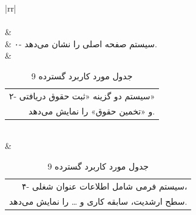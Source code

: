 \documentclass[12pt]{article}
\begin{document}
	\begin{center}
		\begin{table}[H]
			\caption{جدول مورد کاربرد گسترده 9}
			\label{tab:ext-uc9}
			\begin{tabular}{|rr|}
				\hline
				\rowcolor{Gainsboro!60}
				                                                                                                                                                                           \\ \hline
				                                                                                                                                                                                                                                          \\ \hline
				                                                                                            &                                                                                \\ \hline
				                                                                                                                    & ۰-  سیستم صفحه اصلی را نشان می‌دهد.                                                                                           \\ \hline
				      & \begin{tabular}[c]{@{}r@{}}۲- سیستم دو گزینه «ثبت حقوق دریافتی» \\ و «تخمین حقوق» را نمایش می‌دهد.\end{tabular}               \\ \hline
				                          & \begin{tabular}[c]{@{}r@{}}۴- سیستم فرمی شامل اطلاعات عنوان شغلی، \\ سطح ارشدیت، سابقه کاری و … را نمایش می‌دهد.\end{tabular} \\ \hline

\end{tabular}
\end{table}
\end{center}
\end{document}
